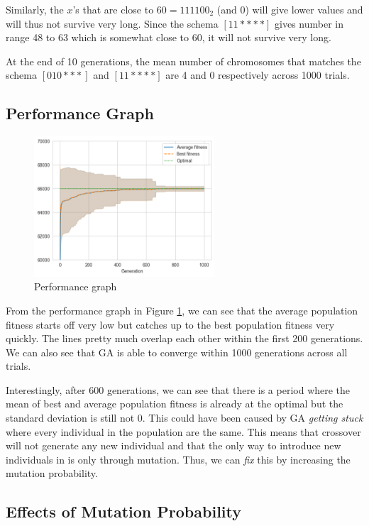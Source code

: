 Similarly, the \(x\)'s that are close to \(60 = 111100_2\) (and 0) will give lower values and will thus not survive very long. Since the schema \([11{{}****{}}]\) gives number in range 48 to 63 which is somewhat close to 60, it will not survive very long.

At the end of 10 generations, the mean number of chromosomes that matches the schema \([010{{}***{}}]\) and \([11{{}****{}}]\) are 4 and 0 respectively across 1000 trials.

\subsection{Performance Graph}

\begin{figure}[ht]
    \centering
    \includegraphics[width=0.6\textwidth]{../images/p2/part4.png}
    \caption{Performance graph}
    \label{fig:p4-4}
\end{figure}

From the performance graph in Figure \ref{fig:p4-4}, we can see that the average population fitness starts off very low but catches up to the best population fitness very quickly. The lines pretty much overlap each other within the first 200 generations. We can also see that GA is able to converge within 1000 generations across all trials.

Interestingly, after 600 generations, we can see that there is a period where the mean of best and average population fitness is already at the optimal but the standard deviation is still not 0. This could have been caused by GA \textit{getting stuck} where every individual in the population are the same. This means that crossover will not generate any new individual and that the only way to introduce new individuals in is only through mutation. Thus, we can \textit{fix} this by increasing the mutation probability.

\subsection{Effects of Mutation Probability}

